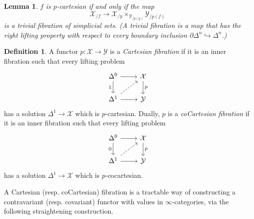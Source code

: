 \documentclass[11pt]{article}
\newtheorem{lemma}[theorem]{Lemma}
\theoremstyle{definition}
\newtheorem{definition}[theorem]{Definition}
\newcommand{\X}{\mathcal{X}}
\newcommand{\Y}{\mathcal{Y}}
\begin{document}
\begin{lemma}
    $f$ is $p$-cartesian if and only if the map
    \[
        \X_{/f} \to \X_{/y} \times_{\Y_{/p(y)}} \Y_{/p(f)}
    \]
    is a trivial fibration of simplicial sets.
    (A trivial fibration is a map that has the right lifting property with respect to every boundary inclusion $\partial \Delta^n \hookrightarrow \Delta^n$.)
\end{lemma}

\begin{definition}
    A functor $p : \X \to \Y$ is a \emph{Cartesian fibration} if it is an inner fibration such that every lifting problem
    \[\begin{tikzcd}
        {\Delta^0} & \X \\
        {\Delta^1} & \Y
        \arrow[from=1-1, to=1-2]
        \arrow["1"', from=1-1, to=2-1]
        \arrow["p", from=1-2, to=2-2]
        \arrow[dashed, from=2-1, to=1-2]
        \arrow[from=2-1, to=2-2]
    \end{tikzcd}\]
    has a solution $\Delta^1 \to \X$ which is $p$-cartesian.
    Dually, $p$ is a \emph{coCartesian fibration} if it is an inner fibration such that every lifting problem
    \[\begin{tikzcd}
        {\Delta^0} & \X \\
        {\Delta^1} & \Y
        \arrow[from=1-1, to=1-2]
        \arrow["0"', from=1-1, to=2-1]
        \arrow["p", from=1-2, to=2-2]
        \arrow[dashed, from=2-1, to=1-2]
        \arrow[from=2-1, to=2-2]
    \end{tikzcd}\]
    has a solution $\Delta^1 \to \X$ which is $p$-cocartesian.
\end{definition}

A Cartesian (resp. coCartesian) fibration is a tractable way of constructing a contravariant (resp. covariant) functor with values in $\infty$-categories, via the following straightening construction.
\end{document}
